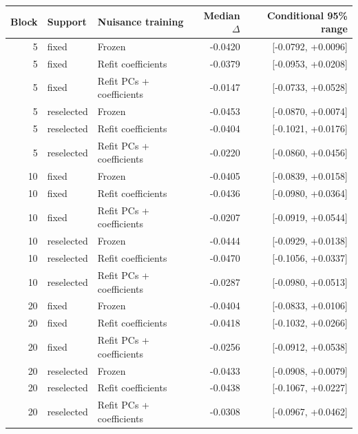 \begin{tabular}{rllrr}
\toprule
Block & Support & Nuisance training & Median $\Delta$ & Conditional 95\% range \\
\midrule
5 & fixed & Frozen & -0.0420 & [-0.0792, +0.0096] \\
5 & fixed & Refit coefficients & -0.0379 & [-0.0953, +0.0208] \\
5 & fixed & Refit PCs + coefficients & -0.0147 & [-0.0733, +0.0528] \\
5 & reselected & Frozen & -0.0453 & [-0.0870, +0.0074] \\
5 & reselected & Refit coefficients & -0.0404 & [-0.1021, +0.0176] \\
5 & reselected & Refit PCs + coefficients & -0.0220 & [-0.0860, +0.0456] \\
10 & fixed & Frozen & -0.0405 & [-0.0839, +0.0158] \\
10 & fixed & Refit coefficients & -0.0436 & [-0.0980, +0.0364] \\
10 & fixed & Refit PCs + coefficients & -0.0207 & [-0.0919, +0.0544] \\
10 & reselected & Frozen & -0.0444 & [-0.0929, +0.0138] \\
10 & reselected & Refit coefficients & -0.0470 & [-0.1056, +0.0337] \\
10 & reselected & Refit PCs + coefficients & -0.0287 & [-0.0980, +0.0513] \\
20 & fixed & Frozen & -0.0404 & [-0.0833, +0.0106] \\
20 & fixed & Refit coefficients & -0.0418 & [-0.1032, +0.0266] \\
20 & fixed & Refit PCs + coefficients & -0.0256 & [-0.0912, +0.0538] \\
20 & reselected & Frozen & -0.0433 & [-0.0908, +0.0079] \\
20 & reselected & Refit coefficients & -0.0438 & [-0.1067, +0.0227] \\
20 & reselected & Refit PCs + coefficients & -0.0308 & [-0.0967, +0.0462] \\
\bottomrule
\end{tabular}
